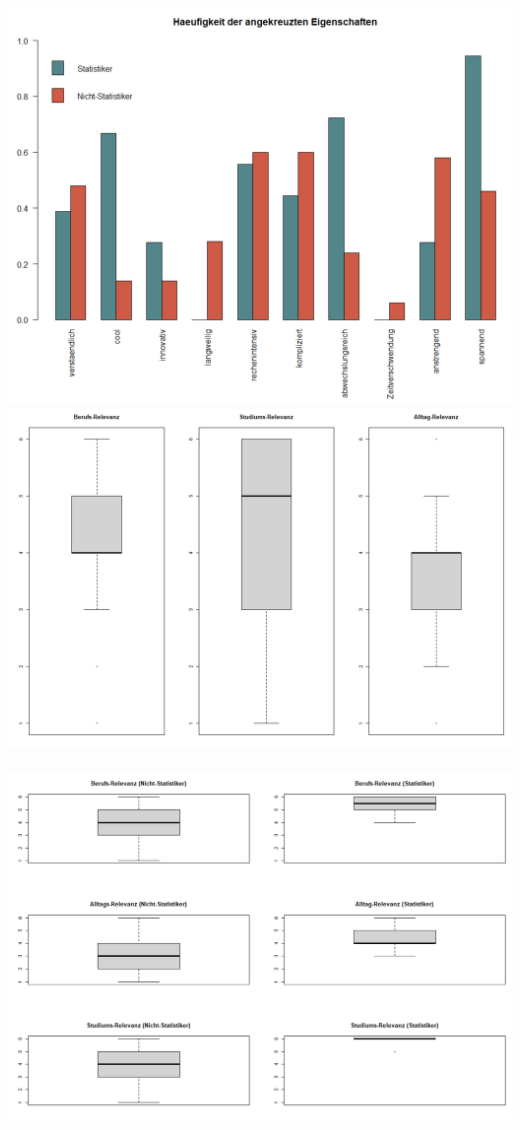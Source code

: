\documentclass[12pt,a4paper,titlepage=true,parskip,ngerman]{scrartcl}
\begin{document}
\includegraphics[scale=0.5]{(nicht)-statis_Hfgkeit_angekreuzter_Eigenschaften}\\


\includegraphics[scale=0.5]{3_boxplots_relevanz}\\
\vspace{0.2cm}\\
\includegraphics[scale=0.5]{(nicht)-statis_boxplots_Relevanz}\\
\end{document}
